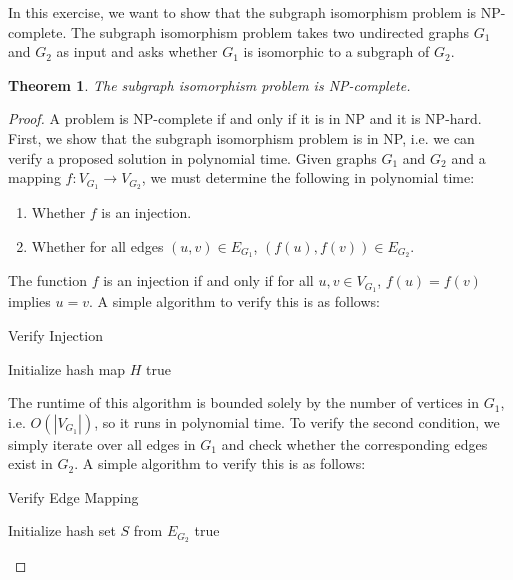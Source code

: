 \documentclass{article}
\newtheorem{theorem}{Theorem}
\begin{document}
\noindent
In this exercise, we want to show that the subgraph isomorphism problem is NP-complete.
The subgraph isomorphism problem takes two undirected graphs $G_1$ and $G_2$ as input and asks whether $G_1$ is isomorphic to a subgraph of $G_2$.

\begin{theorem}
The subgraph isomorphism problem is NP-complete.
\end{theorem}

\begin{proof}
    A problem is NP-complete if and only if it is in NP and it is NP-hard.
    First, we show that the subgraph isomorphism problem is in NP, i.e. we can verify a proposed solution in polynomial time.
    Given graphs $G_1$ and $G_2$ and a mapping $f: V_{G_1} \to V_{G_2}$, we must determine the following in polynomial time:
    \begin{enumerate}
        \item Whether $f$ is an injection.
        \item Whether for all edges $(u, v) \in E_{G_1}$, $(f(u), f(v)) \in E_{G_2}$.
    \end{enumerate}
    The function $f$ is an injection if and only if for all $u, v \in V_{G_1}$, $f(u) = f(v)$ implies $u = v$.
    A simple algorithm to verify this is as follows:

    \begin{algorithm}[H]
        \caption{Verify Injection}
        Initialize hash map $H$\;
        \Return true\;
    \end{algorithm}

    The runtime of this algorithm is bounded solely by the number of vertices in $G_1$, i.e. $O(|V_{G_1}|)$, so it runs in polynomial time.
    To verify the second condition, we simply iterate over all edges in $G_1$ and check whether the corresponding edges exist in $G_2$.
    A simple algorithm to verify this is as follows:

    \begin{algorithm}[H]
        \caption{Verify Edge Mapping}
        Initialize hash set $S$ from $E_{G_2}$\;
        \Return true\;
    \end{algorithm}


\end{proof}
\end{document}
